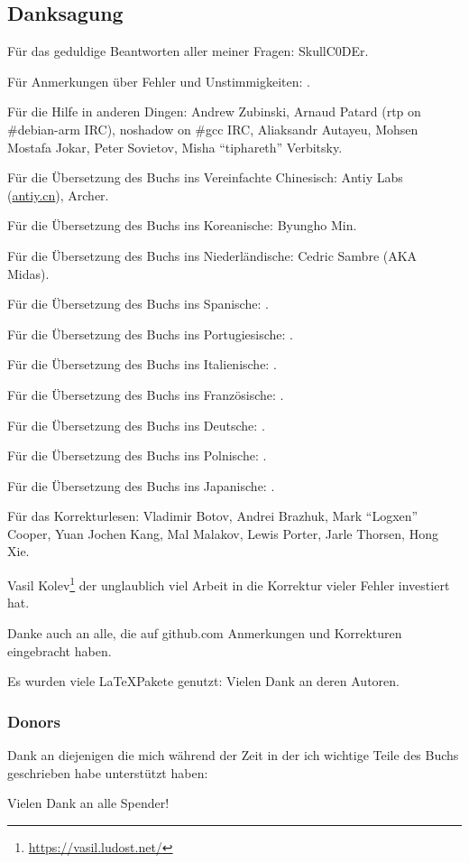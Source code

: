 \subsection*{Danksagung}

Für das geduldige Beantworten aller meiner Fragen: SkullC0DEr.

Für Anmerkungen über Fehler und Unstimmigkeiten: \PeopleMistakesInaccuracies{}.

Für die Hilfe in anderen Dingen:
Andrew Zubinski,
Arnaud Patard (rtp on \#debian-arm IRC),
noshadow on \#gcc IRC,
Aliaksandr Autayeu,
Mohsen Mostafa Jokar,
Peter Sovietov,
Misha ``tiphareth'' Verbitsky.

Für die Übersetzung des Buchs ins Vereinfachte Chinesisch:
Antiy Labs (\href{http://antiy.cn}{antiy.cn}), Archer.

Für die Übersetzung des Buchs ins Koreanische: Byungho Min.

Für die Übersetzung des Buchs ins Niederländische: Cedric Sambre (AKA Midas).

Für die Übersetzung des Buchs ins Spanische: \PeopleSpanishTranslators{}.

Für die Übersetzung des Buchs ins Portugiesische: \PeoplePTBRTranslators{}.

Für die Übersetzung des Buchs ins Italienische: \PeopleItalianTranslators{}.

Für die Übersetzung des Buchs ins Französische: \PeopleFrenchTranslators{}.

Für die Übersetzung des Buchs ins Deutsche: \PeopleGermanTranslators{}.

Für die Übersetzung des Buchs ins Polnische: \PeoplePolishTranslators{}.

Für die Übersetzung des Buchs ins Japanische: \PeopleJapaneseTranslators{}.

Für das Korrekturlesen:
Vladimir Botov,
Andrei Brazhuk,
Mark ``Logxen'' Cooper, Yuan Jochen Kang, Mal Malakov, Lewis Porter, Jarle Thorsen, Hong Xie.

Vasil Kolev\footnote{\url{https://vasil.ludost.net/}} der unglaublich viel Arbeit in die Korrektur vieler Fehler investiert hat.

Danke auch an alle, die auf github.com Anmerkungen und Korrekturen eingebracht haben.

Es wurden viele \LaTeX\-Pakete genutzt: Vielen Dank an deren Autoren.

\subsubsection*{Donors}

Dank an diejenigen die mich während der Zeit in der ich wichtige Teile des Buchs geschrieben habe
unterstützt haben:



Vielen Dank an alle Spender!
